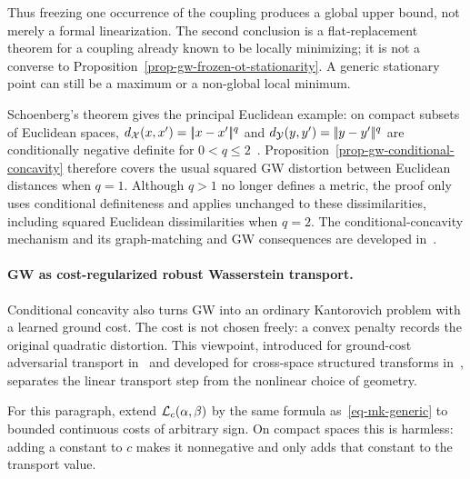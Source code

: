 Thus freezing one occurrence of the coupling produces a global upper bound, not merely a formal linearization. The second conclusion is a flat-replacement theorem for a coupling already known to be locally minimizing; it is not a converse to Proposition~\ref{prop-gw-frozen-ot-stationarity}. A generic stationary point can still be a maximum or a non-global local minimum.

Schoenberg's theorem gives the principal Euclidean example: on compact subsets of Euclidean spaces, $d_{\mathcal{X}}(x,x')=|\!| x-x' |\!|^q$ and $d_{\mathcal{Y}}(y,y')=|\!| y-y' |\!|^q$ are conditionally negative definite for $0<q\leq2$~\cite{schoenberg38}. Proposition~\ref{prop-gw-conditional-concavity} therefore covers the usual squared GW distortion between Euclidean distances when $q=1$. Although $q>1$ no longer defines a metric, the proof only uses conditional definiteness and applies unchanged to these dissimilarities, including squared Euclidean dissimilarities when $q=2$. The conditional-concavity mechanism and its graph-matching and GW consequences are developed in~\cite{MaronLipman2018,SejourneVialardPeyre2021,Vayer2026GWSparsity}.

\paragraph{GW as cost-regularized robust Wasserstein transport.}
Conditional concavity also turns GW into an ordinary Kantorovich problem with a learned ground cost. The cost is not chosen freely: a convex penalty records the original quadratic distortion. This viewpoint, introduced for ground-cost adversarial transport in~\cite{PatyCuturi2020GroundCost} and developed for cross-space structured transforms in~\cite{SebbouhCuturiPeyre2024}, separates the linear transport step from the nonlinear choice of geometry.

For this paragraph, extend $\mathcal{L}_c(\alpha,\beta)$ by the same formula as~\eqref{eq-mk-generic} to bounded continuous costs of arbitrary sign. On compact spaces this is harmless: adding a constant to $c$ makes it nonnegative and only adds that constant to the transport value.

